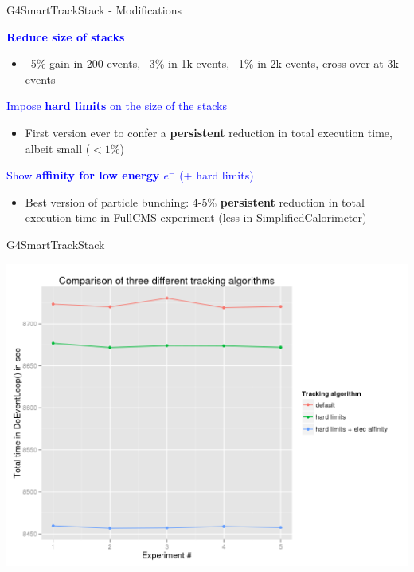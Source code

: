 \documentclass{beamer}
\begin{document}
\begin{frame}{G4SmartTrackStack - Modifications}

\textcolor{blue}{{\bf Reduce size of stacks}}
\begin{itemize}
\item ~5\% gain in 200 events, ~3\% in 1k events, ~1\% in 2k events, cross-over at 3k events
\end{itemize}
\textcolor{blue}{Impose {\bf hard limits} on the size of the stacks}
\begin{itemize}
\item First version ever to confer a {\bf persistent} reduction in total execution time, albeit small ($<1\%$)
\end{itemize}
\textcolor{blue}{Show {\bf affinity for low energy $e^-$} (+ hard limits)}
\begin{itemize}
\item Best version of particle bunching: 4-5\% {\bf persistent} reduction in total execution time
in FullCMS experiment (less in SimplifiedCalorimeter)
\end{itemize}
\end{frame}

\begin{frame}{G4SmartTrackStack}

\begin{center}
  \includegraphics[width=1.0\textwidth]{trackingcmp.png}
\end{center}
\end{frame}
\end{document}
